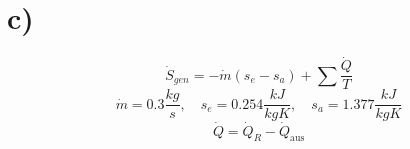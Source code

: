 

\section*{c)}
\begin{equation*}
\dot{S}_{gen} = -\dot{m}(s_e - s_a) + \sum \frac{\dot{Q}}{T}
\end{equation*}
\begin{equation*}
\dot{m} = 0.3 \frac{kg}{s}, \quad s_e = 0.254 \frac{kJ}{kgK}, \quad s_a = 1.377 \frac{kJ}{kgK}
\end{equation*}
\begin{equation*}
\dot{Q} = \dot{Q}_R - \dot{Q}_{\text{aus}}
\end{equation*}